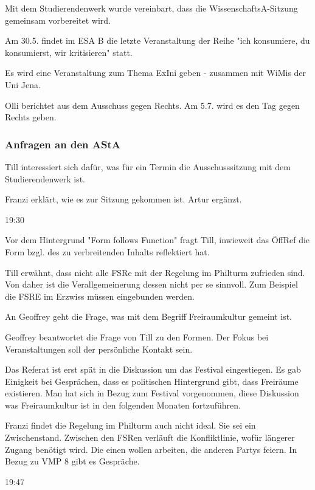\documentclass[ngerman,headheight=70pt]{scrartcl}
\begin{document}
    Mit dem Studierendenwerk wurde vereinbart, dass die WissenschaftsA-Sitzung
    gemeinsam vorbereitet wird.

    Am 30.5. findet im ESA B die letzte Veranstaltung der Reihe "ich konsumiere,
    du konsumierst, wir kritisieren" statt.

    Es wird eine Veranstaltung zum Thema ExIni geben - zusammen mit WiMis
    der Uni Jena.


    Olli berichtet aus dem Ausschuss gegen Rechts. Am 5.7. wird es den Tag
    gegen Rechts geben.

    \subsubsection{Anfragen an den AStA}

    Till interessiert sich dafür, was für ein Termin die Ausschusssitzung
    mit dem Studierendenwerk ist.

    Franzi erklärt, wie es zur Sitzung gekommen ist. Artur ergänzt.

    19:30

    Vor dem Hintergrund "Form follows Function" fragt Till, inwieweit
    das ÖffRef die Form bzgl. des zu verbreitenden Inhalts reflektiert
    hat.

    Till erwähnt, dass nicht alle FSRe mit der Regelung im Philturm
    zufrieden sind. Von daher ist die Verallgemeinerung dessen nicht
    per se sinnvoll. Zum Beispiel die FSRE im Erzwiss müssen eingebunden
    werden.

    An Geoffrey geht die Frage, was mit dem Begriff Freiraumkultur gemeint
    ist.

    Geoffrey beantwortet die Frage von Till zu den Formen. Der Fokus
    bei Veranstaltungen soll der persönliche Kontakt sein.

    Das Referat ist erst spät in die Diskussion um das Festival eingestiegen.
    Es gab Einigkeit bei Gesprächen, dass es politischen Hintergrund gibt, dass
    Freiräume existieren. Man hat sich in Bezug zum Festival vorgenommen,
    diese Diskussion was Freiraumkultur ist in den folgenden Monaten
    fortzuführen.

    Franzi findet die Regelung im Philturm auch nicht ideal. Sie sei ein
    Zwischenstand. Zwischen den FSRen verläuft die Konfliktlinie, wofür längerer
    Zugang benötigt wird. Die einen wollen arbeiten, die anderen Partys feiern.
    In Bezug zu VMP 8 gibt es Gespräche.

    19:47
\end{document}
